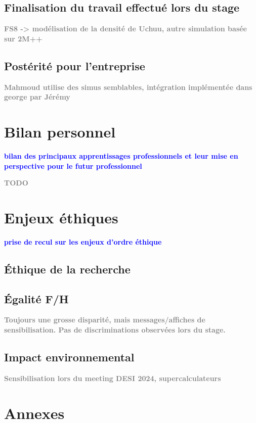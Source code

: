 \documentclass{book}
\newcommand{\todo}[1]{{\textcolor{gray}{\bf \large #1}}}
\newcommand{\consignes}[1]{{\textcolor{blue}{\bf \large #1}}}
\begin{document}
\section{Finalisation du travail effectué lors du stage}

\todo{FS8 -> modélisation de la densité de Uchuu, autre simulation basée sur 2M++}

\section{Postérité pour l'entreprise}

\todo{Mahmoud utilise des simus semblables, intégration implémentée dans george par Jérémy}




\chapter{Bilan personnel}
\consignes{bilan des principaux apprentissages professionnels et leur mise en perspective pour le futur professionnel}

\todo{TODO}



\chapter{Enjeux éthiques}
\consignes{prise de recul sur les enjeux d’ordre éthique}

\section{Éthique de la recherche}

\section{Égalité F/H}

\todo{Toujours une grosse disparité, mais messages/affiches de sensibilisation. Pas de discriminations observées lors du stage.}

\section{Impact environnemental}

\todo{Sensibilisation lors du meeting DESI 2024, supercalculateurs}





\appendix
\chapter{Annexes}
\end{document}
